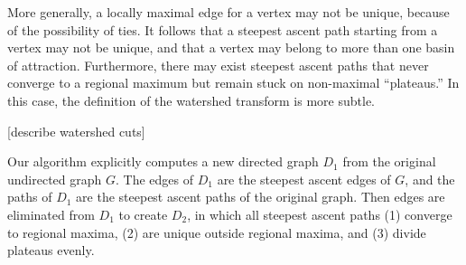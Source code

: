 \documentclass{article}
\begin{document}
More generally, a locally maximal edge for a vertex may not be unique,
because of the possibility of ties.  It follows that a steepest
ascent path starting from a vertex may not be unique, and that a
vertex may belong to more than one basin of attraction.  Furthermore,
there may exist steepest ascent paths that never converge to a
regional maximum but remain stuck on non-maximal ``plateaus.''  In
this case, the definition of the watershed transform is more subtle.

[describe watershed cuts]

Our algorithm explicitly computes a new directed graph $D_1$ from the
original undirected graph $G$.  The edges of $D_1$ are the steepest
ascent edges of $G$, and the paths of $D_1$ are the steepest ascent
paths of the original graph.  Then edges are eliminated from $D_1$ to
create $D_2$, in which all steepest ascent paths (1) converge to
regional maxima, (2) are unique outside regional maxima, and (3)
divide plateaus evenly.
\end{document}
